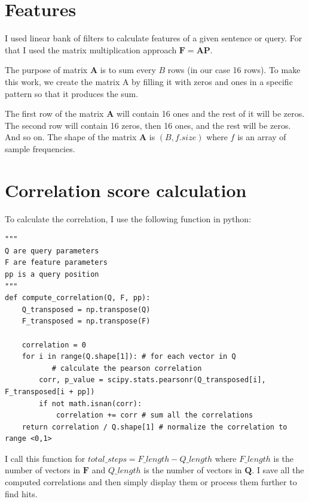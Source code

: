 \documentclass[11pt]{article}
\begin{document}
\section{Features}
\par
I used linear bank of filters to calculate features of a given sentence or query. For that I used the matrix multiplication approach $\mathbf{F} = \mathbf{AP}$. 
\par
The purpose of matrix $\mathbf{A}$ is to sum every $B$ rows (in our case 16 rows). To make this work, we create the matrix A by filling it with zeros and ones in a specific pattern so that it produces the sum.
\par 
The first row of the matrix $\mathbf{A}$ will contain 16 ones and the rest of it will be zeros. The second row will contain 16 zeros, then 16 ones, and the rest will be zeros. And so on. 
The shape of the matrix $\mathbf{A}$ is $(B, f.size)$ where $f$ is an array of sample frequencies.

\section{Correlation score calculation}
\par
To calculate the correlation, I use the following function in python:

\lstset{language=Python}
\lstset{frame=lines}
\lstset{basicstyle=\footnotesize}
\begin{lstlisting}	
"""
Q are query parameters
F are feature parameters
pp is a query position
"""
def compute_correlation(Q, F, pp):
    Q_transposed = np.transpose(Q)
    F_transposed = np.transpose(F)
    
    correlation = 0
    for i in range(Q.shape[1]): # for each vector in Q
    	   # calculate the pearson correlation
        corr, p_value = scipy.stats.pearsonr(Q_transposed[i], F_transposed[i + pp])
        if not math.isnan(corr):
            correlation += corr	# sum all the correlations
    return correlation / Q.shape[1] # normalize the correlation to range <0,1>
\end{lstlisting}

\par
I call this function for $total\_steps = F\_length - Q\_length$ where $F\_length$ is the number of vectors in $\mathbf{F}$ and $Q\_length$ is the number of vectors in $\mathbf{Q}$. I save all the computed correlations and then simply display them or process them further to find hits.
\end{document}

